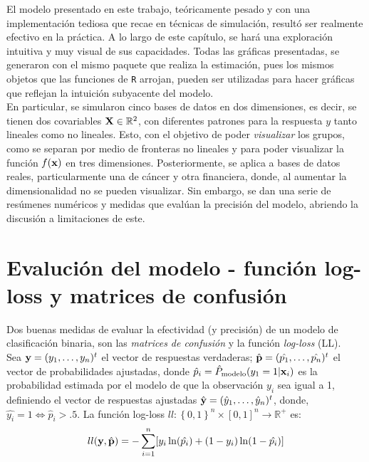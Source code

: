 \documentclass[../Main/Main.tex]{subfiles}
\begin{document}
El modelo presentado en este trabajo, teóricamente pesado y con una implementación tediosa que recae en técnicas de simulación, resultó ser realmente efectivo en la práctica. A lo largo de este capítulo, se hará una exploración intuitiva y muy visual de sus capacidades. Todas las gráficas presentadas, se generaron con el mismo paquete que realiza la estimación, pues los mismos objetos que las funciones de \verb|R| arrojan, pueden ser utilizadas para hacer gráficas que reflejan la intuición subyacente del modelo. \\

En particular, se simularon cinco bases de datos en dos dimensiones, es decir, se tienen dos covariables $\mathbf{X}\in\mathbb{R}^2$,  con diferentes patrones para la respuesta $y$ tanto lineales como no lineales. Esto, con el objetivo de poder \textit{visualizar} los grupos, como se separan por medio de fronteras no lineales y para poder visualizar la función $f(\mathbf{x})$ en tres dimensiones. Posteriormente, se aplica a bases de datos reales, particularmente una de cáncer y otra financiera, donde, al aumentar la dimensionalidad no se pueden visualizar. Sin embargo, se dan una serie de resúmenes numéricos y medidas que evalúan la precisión del modelo, abriendo la discusión a limitaciones de este. 

\section{Evalución del modelo - función log-loss y matrices de confusión}
Dos buenas medidas de evaluar la efectividad (y precisión) de un modelo de clasificación binaria, son las \textit{matrices de confusión} y la función \textit{log-loss} (LL).\\

Sea $\mathbf{y} = (y_1,\ldots,y_n)^t$ el vector de respuestas verdaderas; $\hat{\mathbf{p}} = (\hat{p_1},\ldots,\hat{p_n})^t$ el vector de probabilidades ajustadas, donde $\hat{p}_i = \hat{P}_{\text{modelo}}(y_1 = 1|\mathbf{x}_i)$ es la probabilidad estimada por el modelo de que la observación $y_i$ sea igual a 1, definiendo el vector de respuestas ajustadas $\hat{\mathbf{y}} = (\hat{y}_1,\ldots,\hat{y}_n)^t$, donde, $\hat{y_i} = 1 \iff \hat{p}_i > .5$. La función log-loss $ll:\left\{0,1\right\}^n\times[0,1]^n\rightarrow \mathbb{R}^+$ es:
\begin{align}
	ll(\mathbf{y},\hat{\mathbf{p}}) = -\sum_{i = 1}^n[ y_i \ln(\hat{p_i}) + (1-y_i)\ln(1-\hat{p_i})] \label{ec:LogLoss}
\end{align}
\end{document}
